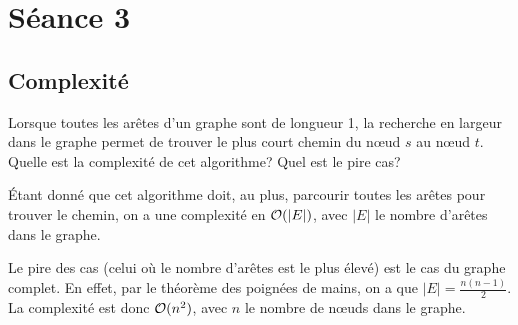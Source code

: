 %
%

\section{Séance 3}


\subsection{Complexité} Lorsque toutes les arêtes d'un graphe sont de longueur 1, la recherche en largeur dans le graphe permet de trouver le plus court chemin du nœud $s$ au nœud $t$. Quelle est la complexité de cet algorithme? Quel est le pire cas?

\begin{solution}
  Étant donné que cet algorithme doit, au plus, parcourir toutes les arêtes pour trouver le chemin,
  on a une complexité en $\mathcal{O}(\vert E \vert)$, avec $\vert E \vert$ le nombre d'arêtes dans le graphe.

  Le pire des cas (celui où le nombre d'arêtes est le plus élevé) est le cas du graphe complet.
  En effet, par le théorème des poignées de mains, on a que $\vert E \vert = \frac{n(n-1)}{2}$.
  La complexité est donc $\mathcal{O}(n^2)$, avec $n$ le nombre de nœuds dans le graphe.
\end{solution}

